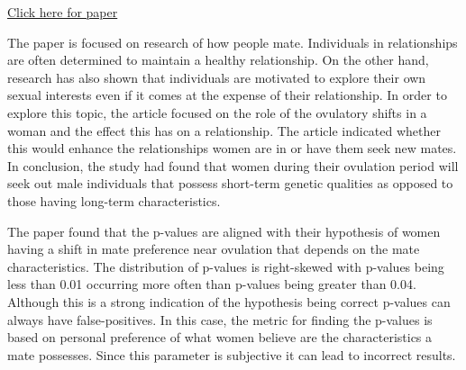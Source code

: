 \documentclass[./ProjectReport.tex]{subfiles}
\begin{document}
\maketitle

\begin{center}
\par
\href{https://static1.squarespace.com/static/504114b1e4b0b97fe5a520af/t/56f84581f850827e6f46c442/1459111298221/DuranteEastwickFinkelGangestadSimpson2016AESP.pdf}{Click here for paper}
\end{center}


\setlength{\parindent}{10ex}

The paper is focused on research of how people mate. Individuals in relationships are often determined to maintain a healthy relationship. On the other hand, research has also shown that individuals are motivated to explore their own sexual interests even if it comes at the expense of their relationship. In order to explore this topic, the article focused on the role of the ovulatory shifts in a woman and the effect this has on a relationship. The article indicated whether this would enhance the relationships women are in or  have them seek new mates. In conclusion, the study had found that women during their ovulation period will seek out male individuals that possess short-term genetic qualities as opposed to those having long-term characteristics.

\par
The paper found that the p-values are aligned with their hypothesis of women having a shift in mate preference near ovulation that depends on the mate characteristics. The distribution of p-values is right-skewed with p-values being less than 0.01 occurring more often than p-values being greater than 0.04. Although this is a strong indication of the hypothesis being correct p-values can always have false-positives. In this case, the metric for finding the p-values is based on personal preference of what women believe are the characteristics a mate possesses. Since this parameter is subjective it can lead to incorrect results.
\end{document}
